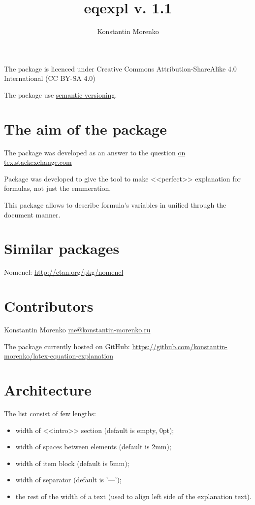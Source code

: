 \documentclass{article}
\begin{document}
\title{eqexpl v. 1.1}
\author{Konstantin Morenko}

\maketitle

The package is licenced under Creative Commons Attribution-ShareAlike
4.0 International (CC BY-SA 4.0)

The package use \href{https://semver.org/}{semantic versioning}.

\section{The aim of the package}

The package was developed as an answer to the question \href{https://tex.stackexchange.com/q/95838/119485}{on tex.stackexchange.com}

Package was developed to give the tool to make <<perfect>> explanation
for formulas, not just the enumeration.

This package allows to describe formula's variables in unified through
the document manner.

\section{Similar packages}

Nomencl: \href{http://ctan.org/pkg/nomencl}{http://ctan.org/pkg/nomencl}

\section{Contributors}

Konstantin Morenko \href{mailto:me@konstantin-morenko.ru}{me@konstantin-morenko.ru}

The package currently hosted on GitHub:
\href{https://github.com/konstantin-morenko/latex-equation-explanation}{https://github.com/konstantin-morenko/latex-equation-explanation}

\section{Architecture}

The list consist of few lengths:
\begin{itemize}
\item width of <<intro>> section (default is empty, 0pt);
\item width of spaces between elements (default is 2mm);
\item width of item block (default is 5mm);
\item width of separator (default is '---');
\item the rest of the width of a text (used to align left side of the
  explanation text).
\end{itemize}
\end{document}
